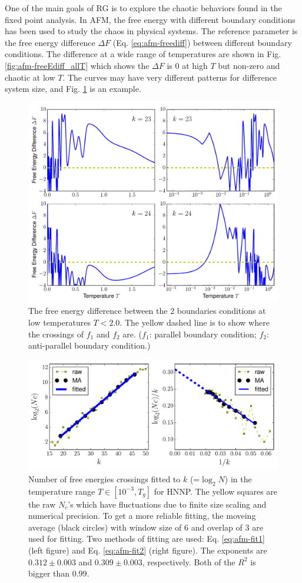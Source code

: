 One of the main goals of RG is to explore the chaotic behaviors found in the fixed point analysis.
 In AFM, the free energy with different boundary conditions has been used to study the chaos in physical systems. The reference parameter is the free energy difference $\Delta F$ (Eq. \ref{eq:afm-freediff}) between different boundary conditions. The difference at a wide range of temperatures are shown in Fig. \ref{fig:afm-freeEdiff_allT} which shows the $\Delta F$ is 0 at high $T$ but non-zero and chaotic at low $T$. The curves may have very different patterns for difference system size, and Fig. \ref{fig:afm-freeEdiff}  is an example. 

\begin{figure}
\centering \includegraphics[width=0.8\columnwidth]{Chapter-3/freeEdifference_k23_24.pdf}
\protect\caption{The free energy difference between the 2 boundaries conditions at low temperatures $T<2.0$. The yellow dashed line is to show where the crossings of $f_1$ and $f_2$ are. ($f_1$: parallel boundary condition; $f_2$: anti-parallel boundary condition.) }
\label{fig:afm-freeEdiff} 
\end{figure}

\begin{figure}
\centering \includegraphics[width=0.8\columnwidth]{Chapter-3/chaotic_exponents_freeE_binning.pdf}
\protect\caption{Number of free energies crossings fitted to $k$ (=$\log_2 N$) in the temperature range $T \in [10^{-3}, T_g]$ for HNNP. The yellow squares are the raw $N_c$'s which have fluctuations due to finite size scaling and numerical precision. To get a more reliable fitting, the moveing average (black circles) with window size of 6 and overlap of 3 are used for fitting. Two methods of fitting are used: Eq. \ref{eq:afm-fit1} (left figure) and Eq. \ref{eq:afm-fit2} (right figure). The exponents are $0.312\pm 0.003$ and $0.309 \pm 0.003$, respectively. Both of the $R^2$ is bigger than $0.99$.}
\label{fig:afm-freeEfit} 
\end{figure}

